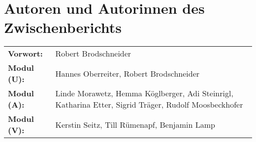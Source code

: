 {}
\section*{Autoren und Autorinnen des Zwischenberichts}
\label{cha:authoren}

\vspace{20mm}


\begin{tabularx}{\textwidth}{l X} 

    \textbf{Vorwort:} &
    Robert Brodschneider \\

    \textbf{Modul (U):} &
    Hannes Oberreiter, Robert Brodschneider \\

    \textbf{Modul (A):} &
    Linde Morawetz, Hemma Köglberger, Adi Steinrigl, \newline
     Katharina Etter, Sigrid Träger, Rudolf Moosbeckhofer \\

    \textbf{Modul (V):} &
    Kerstin Seitz, Till Rümenapf, Benjamin Lamp \\

\end{tabularx}